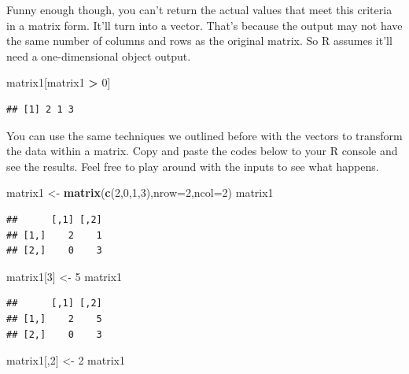 \documentclass[
]{book}
\newenvironment{Shaded}{\begin{snugshade}}{\end{snugshade}}
\newcommand{\DataTypeTok}[1]{\textcolor[rgb]{0.13,0.29,0.53}{#1}}
\newcommand{\DecValTok}[1]{\textcolor[rgb]{0.00,0.00,0.81}{#1}}
\newcommand{\KeywordTok}[1]{\textcolor[rgb]{0.13,0.29,0.53}{\textbf{#1}}}
\newcommand{\NormalTok}[1]{#1}
\newcommand{\OperatorTok}[1]{\textcolor[rgb]{0.81,0.36,0.00}{\textbf{#1}}}
\newcommand{\StringTok}[1]{\textcolor[rgb]{0.31,0.60,0.02}{#1}}
\begin{document}
Funny enough though, you can't return the actual values that meet this criteria in a matrix form. It'll turn into a vector. That's because the output may not have the same number of columns and rows as the original matrix. So R assumes it'll need a one-dimensional object output.

\begin{Shaded}
\begin{Highlighting}[]
\NormalTok{matrix1[matrix1 }\OperatorTok{>}\StringTok{ }\DecValTok{0}\NormalTok{]}
\end{Highlighting}
\end{Shaded}

\begin{verbatim}
## [1] 2 1 3
\end{verbatim}

You can use the same techniques we outlined before with the vectors to transform the data within a matrix. Copy and paste the codes below to your R console and see the results. Feel free to play around with the inputs to see what happens.

\begin{Shaded}
\begin{Highlighting}[]
\NormalTok{matrix1 <-}\StringTok{ }\KeywordTok{matrix}\NormalTok{(}\KeywordTok{c}\NormalTok{(}\DecValTok{2}\NormalTok{,}\DecValTok{0}\NormalTok{,}\DecValTok{1}\NormalTok{,}\DecValTok{3}\NormalTok{),}\DataTypeTok{nrow=}\DecValTok{2}\NormalTok{,}\DataTypeTok{ncol=}\DecValTok{2}\NormalTok{)  }
\NormalTok{matrix1}
\end{Highlighting}
\end{Shaded}

\begin{verbatim}
##      [,1] [,2]
## [1,]    2    1
## [2,]    0    3
\end{verbatim}

\begin{Shaded}
\begin{Highlighting}[]
\NormalTok{matrix1[}\DecValTok{3}\NormalTok{] <-}\StringTok{ }\DecValTok{5}
\NormalTok{matrix1}
\end{Highlighting}
\end{Shaded}

\begin{verbatim}
##      [,1] [,2]
## [1,]    2    5
## [2,]    0    3
\end{verbatim}

\begin{Shaded}
\begin{Highlighting}[]
\NormalTok{matrix1[,}\DecValTok{2}\NormalTok{] <-}\StringTok{ }\DecValTok{2}
\NormalTok{matrix1}
\end{Highlighting}
\end{Shaded}
\end{document}
